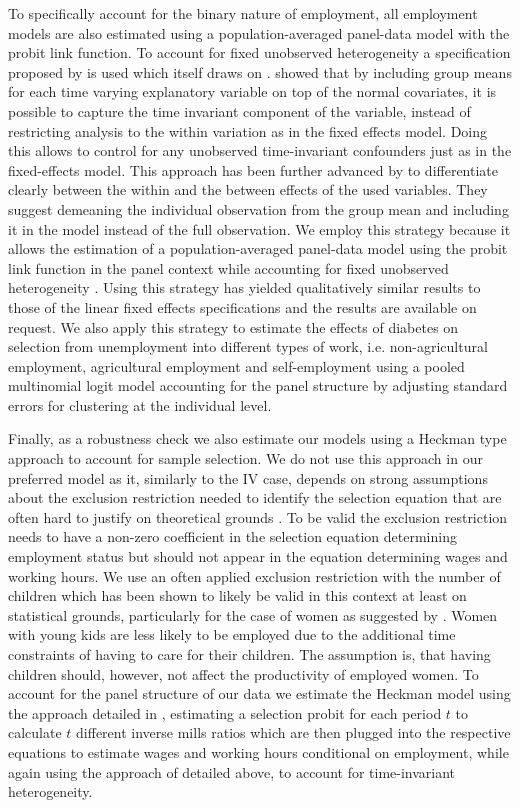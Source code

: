To specifically account for the binary nature of employment, all employment
models are also estimated using a population-averaged panel-data model
with the probit link function. To account for fixed unobserved heterogeneity
a specification proposed by \citet{Bell2015} is used which itself
draws on \citet{Mundlak1978}. \citet{Mundlak1978} showed that by
including group means for each time varying explanatory variable on
top of the normal covariates, it is possible to capture the time invariant
component of the variable, instead of restricting analysis to the
within variation as in the fixed effects model. Doing this allows
to control for any unobserved time-invariant confounders just as in
the fixed-effects model. This approach has been further advanced by
\citet{Bell2015} to differentiate clearly between the within and
the between effects of the used variables. They suggest demeaning
the individual observation from the group mean and including it in
the model instead of the full observation. We employ this strategy
because it allows the estimation of a population-averaged panel-data
model using the probit link function in the panel context while accounting
for fixed unobserved heterogeneity \citep{Dieleman2014}. Using this
strategy has yielded qualitatively similar results to those of the
linear fixed effects specifications and the results are available
on request. We also apply this strategy to estimate the effects of diabetes on selection from unemployment into different types of work, i.e. non-agricultural employment, agricultural employment and self-employment using a pooled multinomial logit model accounting for the panel structure by adjusting standard errors for clustering at the individual level.

Finally, as a robustness check we also estimate our models using a Heckman type approach to account for sample selection. We do not use this approach in our preferred model as it, similarly to the \ac{IV} case, depends on strong assumptions about the exclusion restriction needed to identify the selection equation that are often hard to justify on theoretical grounds \citep{Huber_2013}. To be valid the exclusion restriction needs to have a non-zero coefficient in the selection equation determining employment status but should not appear in the equation determining wages and working hours. We use an often applied exclusion restriction with the number of children which has been shown to likely be valid in this context at least on statistical grounds, particularly for the case of women as suggested by \citet{Huber_2013}. Women with young kids are less likely to be employed due to the additional time constraints of having to care for their children. The assumption is, that having children should, however, not affect the productivity of employed women. To account for the panel structure of our data we estimate the Heckman model using the approach detailed in \citet{Wooldridge2002a}, estimating a selection probit for each period $t$ to calculate $t$ different inverse mills ratios which are then plugged into the respective equations to estimate wages and working hours conditional on employment, while again using the approach of \citet{Bell2015} detailed above, to account for time-invariant heterogeneity.

